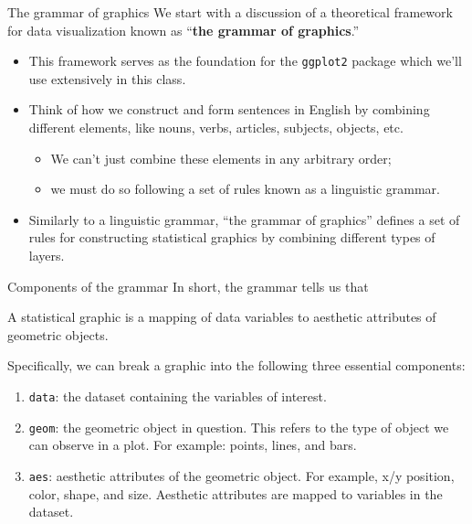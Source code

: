 \documentclass[
  ignorenonframetext,
]{beamer}
\providecommand{\tightlist}{%
  \setlength{\itemsep}{0pt}\setlength{\parskip}{0pt}}
\begin{document}
\begin{frame}[fragile]{The grammar of graphics}
\label{the-grammar-of-graphics}
We start with a discussion of a theoretical framework for data
visualization known as ``\textbf{the grammar of graphics}.''

\begin{itemize}
\item
  This framework serves as the foundation for the \texttt{ggplot2}
  package which we'll use extensively in this class.
\item
  Think of how we construct and form sentences in English by combining
  different elements, like nouns, verbs, articles, subjects, objects,
  etc.

  \begin{itemize}
  \tightlist
  \item
    We can't just combine these elements in any arbitrary order;
  \item
    we must do so following a set of rules known as a linguistic
    grammar.
  \end{itemize}
\item
  Similarly to a linguistic grammar, ``the grammar of graphics'' defines
  a set of rules for constructing statistical graphics by combining
  different types of layers.
\end{itemize}
\end{frame}

\begin{frame}[fragile]{Components of the grammar}
\label{components-of-the-grammar}
In short, the grammar tells us that

\begin{tcolorbox}
A statistical graphic is a mapping of data variables to aesthetic attributes of geometric objects.
\end{tcolorbox}

Specifically, we can break a graphic into the following three essential
components:

\begin{enumerate}
\item
  \texttt{data}: the dataset containing the variables of interest.
\item
  \texttt{geom}: the geometric object in question. This refers to the
  type of object we can observe in a plot. For example: points, lines,
  and bars.
\item
  \texttt{aes}: aesthetic attributes of the geometric object. For
  example, x/y position, color, shape, and size. Aesthetic attributes
  are mapped to variables in the dataset.
\end{enumerate}
\end{frame}
\end{document}
